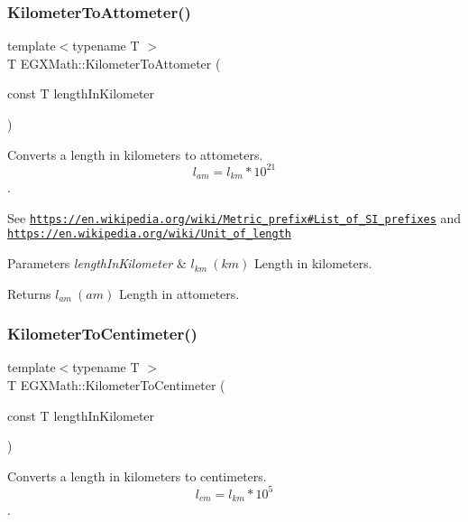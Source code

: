 \subsubsection{\texorpdfstring{Kilometer\+To\+Attometer()}{KilometerToAttometer()}}
{\footnotesize\ttfamily template$<$typename T $>$ \\
T E\+G\+X\+Math\+::\+Kilometer\+To\+Attometer (\begin{DoxyParamCaption}\item[{const T}]{length\+In\+Kilometer }\end{DoxyParamCaption})}



Converts a length in kilometers to attometers. \[ l_{am}=l_{km} * 10^{21} \]. 

See \href{https://en.wikipedia.org/wiki/Metric_prefix#List_of_SI_prefixes}{\tt https\+://en.\+wikipedia.\+org/wiki/\+Metric\+\_\+prefix\#\+List\+\_\+of\+\_\+\+S\+I\+\_\+prefixes} and \href{https://en.wikipedia.org/wiki/Unit_of_length}{\tt https\+://en.\+wikipedia.\+org/wiki/\+Unit\+\_\+of\+\_\+length} 
\begin{DoxyParams}{Parameters}
{\em length\+In\+Kilometer} & $ l_{km}\ (km)$ Length in kilometers. \\
\hline
\end{DoxyParams}
\begin{DoxyReturn}{Returns}
$ l_{am}\ (am)$ Length in attometers. 
\end{DoxyReturn}
\mbox{\label{group___e_g_x_math-_conversions-_length_conversions-_s_i-_kilometer-_s_i_ga1d5cac5eab11ffbf7b839180813343d0}} 
\subsubsection{\texorpdfstring{Kilometer\+To\+Centimeter()}{KilometerToCentimeter()}}
{\footnotesize\ttfamily template$<$typename T $>$ \\
T E\+G\+X\+Math\+::\+Kilometer\+To\+Centimeter (\begin{DoxyParamCaption}\item[{const T}]{length\+In\+Kilometer }\end{DoxyParamCaption})}



Converts a length in kilometers to centimeters. \[ l_{cm}=l_{km} * 10^{5} \]. 

